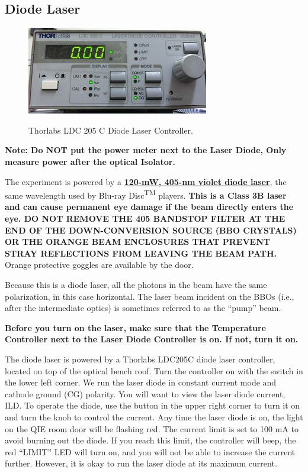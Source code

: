 \documentclass{../lab}
\begin{document}
\subsection{Diode Laser}

\begin{figure}[h]
    \centering
    \href{http://experimentationlab.berkeley.edu/sites/default/files/images/300px-QIE_LDController.jpg}{\includegraphics[width=0.5\linewidth]{images/300px-QIE_LDController.jpg}}
    \caption{Thorlabs LDC 205 C Diode Laser Controller.}
    \label{fig:300px-QIE_LDController}
\end{figure}

\textbf{Note: Do NOT put the power meter next to the Laser Diode, Only measure power after the optical Isolator.}

The experiment is powered by a \href{http://experimentationlab.berkeley.edu/sites/default/files/QIE/D405-120.pdf}{\textbf{120-mW, 405-nm violet diode laser}}, the same wavelength used by Blu-ray Disc\textsuperscript{TM} players. \textbf{This is a Class 3B laser and can cause permanent eye damage if the beam directly enters the eye. DO NOT REMOVE THE 405 BANDSTOP FILTER AT THE END OF THE DOWN-CONVERSION SOURCE (BBO CRYSTALS) OR THE ORANGE BEAM ENCLOSURES THAT PREVENT STRAY REFLECTIONS FROM LEAVING THE BEAM PATH.} Orange protective goggles are available by the door.

Because this is a diode laser, all the photons in the beam have the same polarization, in this case horizontal. The laser beam incident on the BBOs (i.e., after the intermediate optics) is sometimes referred to as the ``pump'' beam.

\textbf{Before you turn on the laser, make sure that the Temperature Controller next to the Laser Diode Controller is on. If not, turn it on.}

The diode laser is powered by a Thorlabs LDC205C diode laser controller, located on top of the optical bench roof. Turn the controller on with the switch in the lower left corner. We run the laser diode in constant current mode and cathode ground (CG) polarity. You will want to view the laser diode current, ILD. To operate the diode, use the button in the upper right corner to turn it on and turn the knob to control the current. Any time the laser diode is on, the light on the QIE room door will be flashing red. The current limit is set to 100 mA to avoid burning out the diode. If you reach this limit, the controller will beep, the red ``LIMIT'' LED will turn on, and you will not be able to increase the current further. However, it is okay to run the laser diode at its maximum current.
\end{document}
